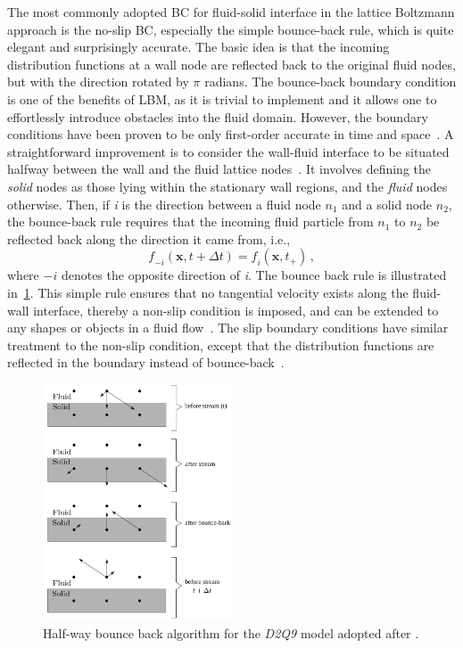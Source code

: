 The most commonly adopted BC for fluid-solid interface in the lattice Boltzmann 
approach is the no-slip BC, especially the simple bounce-back rule, which is 
quite elegant and surprisingly accurate. The basic idea is that the incoming 
distribution functions at a wall node are reflected back to the original fluid 
nodes, but with the direction rotated by $\pi$ radians. The bounce-back 
boundary condition is one of the benefits of LBM, as it is trivial to implement 
and it allows one to effortlessly introduce obstacles into the fluid domain. 
However, the boundary conditions have been proven to be only first-order 
accurate in time and space~\citep{Pan2006}. A straightforward improvement is to 
consider the wall-fluid interface to be situated halfway between the wall and 
the fluid lattice nodes~\citep{Ziegler1993}. It involves defining the 
\textit{solid} nodes as those lying within the stationary wall regions, and the 
\textit{fluid} nodes otherwise. Then, if \textit{i} is the direction between a 
fluid node $\mathit{n}_{1}$ and a solid node $\mathit{n_2}$, the bounce-back 
rule requires that the incoming fluid particle from $\mathit{n}_{1}$ to 
$\mathit{n}_{2}$ be reflected back along the direction it came from, i.e.,
%
\begin{equation}
	\mathit{f}_{-\mathit{i}}(\mathbf{x}, \mathit{t}+\Delta \mathit{t}) = 
	\mathit{f_i}(\mathbf{x}, \mathit{t}_{+})\,,
\end{equation}
%
\noindent where $-\mathit{i}$ denotes the opposite direction of 
\textit{i}. The bounce back rule is illustrated 
in~\cref{fig:bounce}. This simple rule ensures that no 
tangential velocity exists along the fluid-wall interface, 
thereby a non-slip condition is imposed, and can be extended to 
any shapes or objects in a fluid flow~\citep{Han2007b,Zou1997}. 
The slip boundary conditions have similar treatment to the 
non-slip condition, except that the distribution functions are 
reflected in the boundary instead of 
bounce-back~\citep{Succi2001}.

\begin{figure}[htbp]
	\centering
	\includegraphics[width=0.5\textwidth]{bounce}
	\caption[Half-way bounce back algorithm for the \textit{D2Q9} 
	model.]{Half-way 
	bounce back algorithm for the \textit{D2Q9} model adopted after 
	\citet{Sukop2006}.}
	\label{fig:bounce}
\end{figure}

